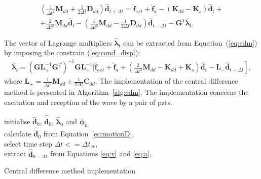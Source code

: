 \documentclass[11pt,a4paper,final]{report}
\begin{document}
\begin{equation}
	\begin{array}{c}
		\left(\frac{1}{\Delta t^2}\textbf{M}_{dd}+\frac{1}{2\Delta t}\textbf{D}_{dd} \right)\widehat{\textbf{d}}_{t+\Delta t}=
		\widehat{\textbf{f}}_{ext} + \widehat{\textbf{f}}_{a} - \left( \textbf{K}_{dd}-\textbf{K}_s\right)\widehat{\textbf{d}}_t+\\
		+\frac{2}{\Delta t^2}\textbf{M}_{dd}\widehat{\textbf{d}}_t-\left(\frac{1}{\Delta t^2}\textbf{M}_{dd}-\frac{1}{2\Delta t}\textbf{D}_{dd}\right)\widehat{\textbf{d}}_{t-\Delta t}-\textbf{G}^T\widehat{\boldsymbol{\lambda}}_t.
	\end{array}
	\label{eq:cdm}
\end{equation}

The vector of Lagrange multipliers \(\widehat{\boldsymbol{\lambda}}_t\) can be extracted from Equation~(\ref{eq:cdm}) by imposing the constrain (\ref{eq:cond_disp}): 
\begin{eqnarray}
	\widehat{\boldsymbol{\lambda}}_t = {\left(\textbf{G}\textbf{L}_+^{-1}\textbf{G}^T \right)}^{-1}\textbf{G}\textbf{L}_+^{-1} \Bigg[ \widehat{\textbf{f}}_{ext} + \widehat{\textbf{f}}_{a} + \left.\left(\frac{2}{\Delta t^2}\textbf{M}_{dd}-\textbf{K}_{dd}+\textbf{K}_s\right)\widehat{\textbf{d}}_t -\textbf{L}_-\widehat{\textbf{d}}_{t-\Delta t} \right],
	\label{eq:lambda}
\end{eqnarray}
where \(\textbf{L}_{\pm}=\frac{1}{\Delta t^2}\textbf{M}_{dd}\pm\frac{1}{2\Delta t}\textbf{C}_{dd}\).
The implementation of the central difference method is presented in Algorithm~\ref{alg:cdm}.
The implementation concerns the excitation and reception of the wave by a pair of \acp{pzt}.

\begin{algorithm}[H]
	\SetAlgoLined
	initialise  \(\widehat{\textbf{d}}_0\), \(\widehat{\dot{\textbf{d}}}_0\), \(\widehat{\boldsymbol{\lambda}}_0\) and \(\boldsymbol{\phi}_{0}\)\\
	calculate \(\widehat{\ddot{\textbf{d}}}_0\) from Equation~\ref{eq:motionD},\\
	select time step \(\Delta t<=\Delta t_{cr}\),\\
	extract \(\widehat{\textbf{d}}_{0-\Delta t}\) from Equations \ref{eq:v} and \ref{eq:a},\\
	\caption{Central difference method implementation}
	\label{alg:cdm}
\end{algorithm}
\end{document}
